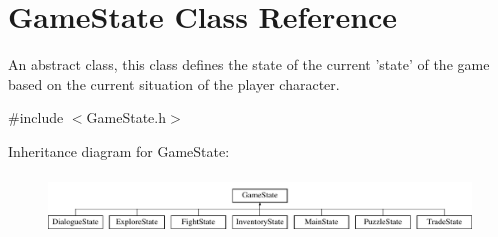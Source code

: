\hypertarget{classGameState}{\section{Game\-State Class Reference}
\label{classGameState}
}


An abstract class, this class defines the state of the current 'state' of the game based on the current situation of the player character.  




{\ttfamily \#include $<$Game\-State.\-h$>$}

Inheritance diagram for Game\-State\-:\begin{figure}[H]
\begin{center}
\leavevmode
\includegraphics[height=1.584159cm]{classGameState}
\end{center}
\end{figure}
